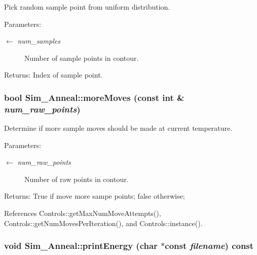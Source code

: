Pick random sample point from uniform distribution. \begin{Desc}
\item[Parameters:]
\begin{description}
\item[\mbox{$\leftarrow$} {\em num\_\-samples}]Number of sample points in contour. \end{description}
\end{Desc}
\begin{Desc}
\item[Returns:]Index of sample point. \end{Desc}
\hypertarget{classSim__Anneal_14635d2687f67b208da7664f272c5a78}{
\subsubsection[moreMoves]{\setlength{\rightskip}{0pt plus 5cm}bool Sim\_\-Anneal::moreMoves (const int \& {\em num\_\-raw\_\-points})}}
\label{classSim__Anneal_14635d2687f67b208da7664f272c5a78}


Determine if more sample moves should be made at current temperature. \begin{Desc}
\item[Parameters:]
\begin{description}
\item[\mbox{$\leftarrow$} {\em num\_\-raw\_\-points}]Number of raw points in contour. \end{description}
\end{Desc}
\begin{Desc}
\item[Returns:]True if move more sampe points; false otherwise; \end{Desc}


References Controls::getMaxNumMoveAttempts(), Controls::getNumMovesPerIteration(), and Controls::instance().\hypertarget{classSim__Anneal_f76b13e223ca4a6b5b544e14a945b805}{
\subsubsection[printEnergy]{\setlength{\rightskip}{0pt plus 5cm}void Sim\_\-Anneal::printEnergy (char $\ast$const  {\em filename}) const}}
\label{classSim__Anneal_f76b13e223ca4a6b5b544e14a945b805}


